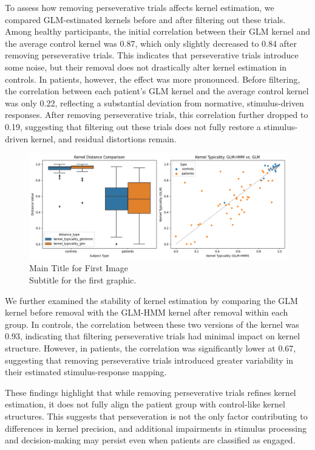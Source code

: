 To assess how removing perseverative trials affects kernel estimation, we compared GLM-estimated kernels before and after filtering out these trials. Among healthy participants, the initial correlation between their GLM kernel and the average control kernel was 0.87, which only slightly decreased to 0.84 after removing perseverative trials. This indicates that perseverative trials introduce some noise, but their removal does not drastically alter kernel estimation in controls. In patients, however, the effect was more pronounced. Before filtering, the correlation between each patient’s GLM kernel and the average control kernel was only 0.22, reflecting a substantial deviation from normative, stimulus-driven responses. After removing perseverative trials, this correlation further dropped to 0.19, suggesting that filtering out these trials does not fully restore a stimulus-driven kernel, and residual distortions remain.  
\begin{figure}[H]
    \centering
    \includegraphics[width=16cm]{MainLayout/Images/chapter7/distance.png}
    \caption{Main Title for First Image \\ \small Subtitle for the first graphic.}
    \label{fig:corr_distance}
\end{figure}
We further examined the stability of kernel estimation by comparing the GLM kernel before removal with the GLM-HMM kernel after removal within each group. In controls, the correlation between these two versions of the kernel was 0.93, indicating that filtering perseverative trials had minimal impact on kernel structure. However, in patients, the correlation was significantly lower at 0.67, suggesting that removing perseverative trials introduced greater variability in their estimated stimulus-response mapping.  

These findings highlight that while removing perseverative trials refines kernel estimation, it does not fully align the patient group with control-like kernel structures. This suggests that perseveration is not the only factor contributing to differences in kernel precision, and additional impairments in stimulus processing and decision-making may persist even when patients are classified as engaged.

